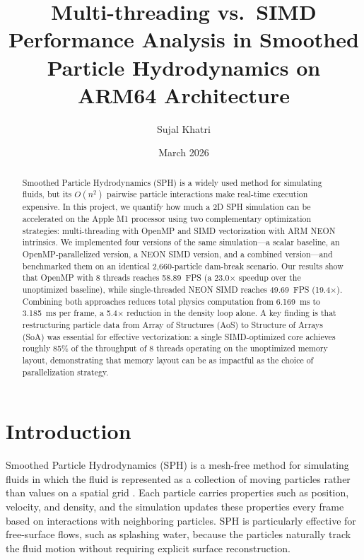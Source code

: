 \documentclass[12pt, a4paper]{article}
\begin{document}
\title{Multi-threading vs.\ SIMD Performance Analysis in Smoothed Particle Hydrodynamics on ARM64 Architecture}

\author{Sujal Khatri}

\date{March 2026}

\maketitle

\begin{abstract}
Smoothed Particle Hydrodynamics (SPH) is a widely used method for simulating fluids, but its $O(n^2)$ pairwise particle interactions make real-time execution expensive. In this project, we quantify how much a 2D SPH simulation can be accelerated on the Apple M1 processor using two complementary optimization strategies: multi-threading with OpenMP and SIMD vectorization with ARM NEON intrinsics. We implemented four versions of the same simulation---a scalar baseline, an OpenMP-parallelized version, a NEON SIMD version, and a combined version---and benchmarked them on an identical 2,660-particle dam-break scenario. Our results show that OpenMP with 8 threads reaches 58.89~FPS (a 23.0$\times$ speedup over the unoptimized baseline), while single-threaded NEON SIMD reaches 49.69~FPS (19.4$\times$). Combining both approaches reduces total physics computation from 6.169~ms to 3.185~ms per frame, a 5.4$\times$ reduction in the density loop alone. A key finding is that restructuring particle data from Array of Structures (AoS) to Structure of Arrays (SoA) was essential for effective vectorization: a single SIMD-optimized core achieves roughly 85\% of the throughput of 8 threads operating on the unoptimized memory layout, demonstrating that memory layout can be as impactful as the choice of parallelization strategy.
\end{abstract}

\section{Introduction}

Smoothed Particle Hydrodynamics (SPH) is a mesh-free method for simulating fluids in which the fluid is represented as a collection of moving particles rather than values on a spatial grid \cite{muller2003particle}. Each particle carries properties such as position, velocity, and density, and the simulation updates these properties every frame based on interactions with neighboring particles. SPH is particularly effective for free-surface flows, such as splashing water, because the particles naturally track the fluid motion without requiring explicit surface reconstruction.
\end{document}
